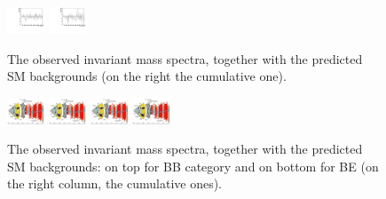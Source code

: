\begin{figure}[htbp]
\centering
\includegraphics[width=0.1\textwidth]{Images/Cap5/res_150_5000_BB_9par.pdf}
\includegraphics[width=0.1\textwidth]{Images/Cap5/res_150_5000_BE_9par.pdf}
\caption{The observed invariant mass spectra, together with the predicted SM backgrounds (on the right the cumulative one).}
\label{mass_plot} 
\end{figure}

\begin{figure}[htbp]
\centering
\includegraphics[width=0.1\textwidth]{Images/ParticleFlow}
\includegraphics[width=0.1\textwidth]{Images/ParticleFlow}
\includegraphics[width=0.1\textwidth]{Images/ParticleFlow}
\includegraphics[width=0.1\textwidth]{Images/ParticleFlow}
\caption{The observed invariant mass spectra, together with the predicted SM backgrounds: on top for BB category and on bottom for BE (on the right column, the cumulative ones).}
\label{mass_plot_cat}
\end{figure}

